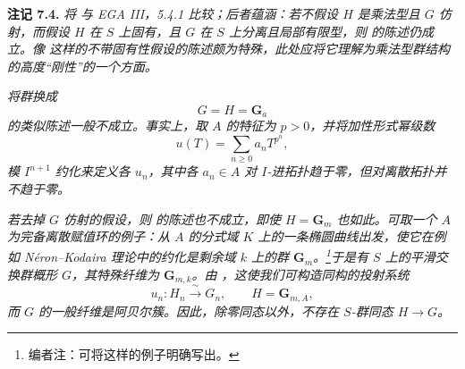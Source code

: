 \medskip
\noindent{}\textbf{注记 7.4.}
\textit{将  与 EGA III，5.4.1 比较；后者蕴涵：若不假设 \(H\) 是乘法型且 \(G\) 仿射，而假设 \(H\) 在 \(S\) 上固有，且 \(G\) 在 \(S\) 上分离且局部有限型，则  的陈述仍成立。像  这样的不带固有性假设的陈述颇为特殊，此处应将它理解为乘法型群结构的高度“刚性”的一个方面。}

\textit{将群换成
\[
  G=H=\mathbf G_a
\]
的类似陈述一般不成立。事实上，取 \(A\) 的特征为 \(p>0\)，并将加性形式幂级数
\[
  u(T)=\sum_{n\geq0}a_nT^{p^n},
\]
模 \(I^{n+1}\) 约化来定义各 \(u_n\)，其中各 \(a_n\in A\) 对 \(I\)-进拓扑趋于零，但对离散拓扑并不趋于零。}

\textit{若去掉 \(G\) 仿射的假设，则  的陈述也不成立，即使 \(H=\mathbf G_m\) 也如此。可取一个 \(A\) 为完备离散赋值环的例子：从 \(A\) 的分式域 \(K\) 上的一条椭圆曲线出发，使它在例如 N\'eron--Kodaira 理论中的约化是剩余域 \(k\) 上的群 \(\mathbf G_m\)。\footnote{编者注：可将这样的例子明确写出。}于是有 \(S\) 上的平滑交换群概形 \(G\)，其特殊纤维为 \(\mathbf G_{m,k}\)。由 ，这使我们可构造同构的投射系统
\[
  u_n:H_n\xrightarrow{\ \sim\ }G_n,
  \qquad H=\mathbf G_{m,A},
\]
而 \(G\) 的一般纤维是阿贝尔簇。因此，除零同态以外，不存在 \(S\)-群同态 \(H\to G\)。}

